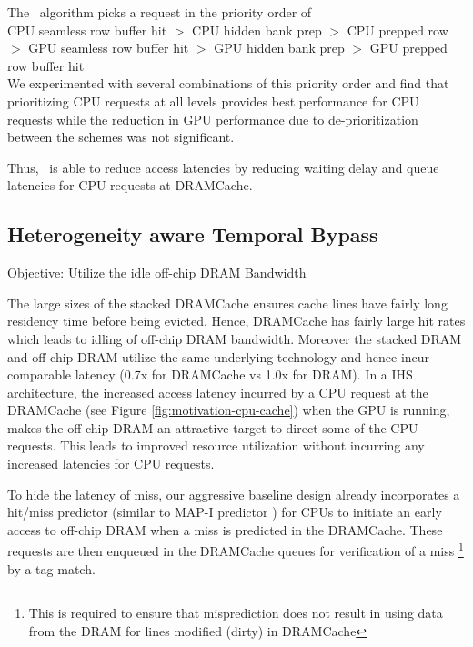 \par The \prioname\ algorithm picks a request in the priority order of \\
CPU seamless row buffer hit $>$ CPU hidden bank prep $>$ CPU prepped row $>$ GPU seamless row buffer hit $>$ GPU hidden bank prep $>$ GPU prepped row buffer hit\\ 
We experimented with several combinations of this priority order and find that prioritizing CPU requests at all levels provides best performance for CPU requests while the reduction in GPU performance due to de-prioritization between the schemes was not significant.
\par Thus, \prioname\ is able to reduce access latencies by reducing waiting delay and queue latencies for CPU requests at DRAMCache.


\subsection{Heterogeneity aware Temporal Bypass} \label{mechanism-bye}
Objective: Utilize the idle off-chip DRAM Bandwidth
\par The large sizes of the stacked DRAMCache ensures cache lines have fairly long residency time before being evicted. Hence, DRAMCache has fairly large hit rates which leads to idling of off-chip DRAM bandwidth. Moreover the stacked DRAM and off-chip DRAM utilize the same underlying technology and hence incur comparable latency (0.7x for DRAMCache vs 1.0x for DRAM). 
In a IHS architecture, the increased access latency incurred by a CPU request at the DRAMCache (see Figure \ref{fig:motivation-cpu-cache}) when the GPU is running, makes the off-chip DRAM an attractive target to direct some of the CPU requests. This leads to improved resource utilization without incurring any increased latencies for CPU requests. 
\par To hide the latency of miss, our aggressive baseline design already incorporates a hit/miss predictor (similar to MAP-I predictor \cite{alloy}) for CPUs to initiate an early access to off-chip DRAM when a miss is predicted in the DRAMCache. These requests are then enqueued in the DRAMCache queues for verification of a miss 
\footnote{This is required to ensure that misprediction does not result in using data from the DRAM for lines modified (dirty) in DRAMCache}
by a tag match. 

